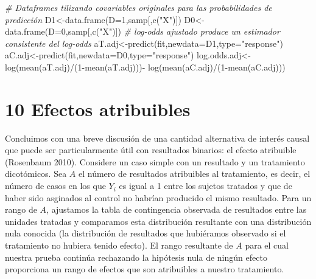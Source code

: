 \documentclass[
]{article}
\newenvironment{Shaded}{\begin{snugshade}}{\end{snugshade}}
\newcommand{\AttributeTok}[1]{\textcolor[rgb]{0.77,0.63,0.00}{#1}}
\newcommand{\CommentTok}[1]{\textcolor[rgb]{0.56,0.35,0.01}{\textit{#1}}}
\newcommand{\DecValTok}[1]{\textcolor[rgb]{0.00,0.00,0.81}{#1}}
\newcommand{\FunctionTok}[1]{\textcolor[rgb]{0.00,0.00,0.00}{#1}}
\newcommand{\NormalTok}[1]{#1}
\newcommand{\OtherTok}[1]{\textcolor[rgb]{0.56,0.35,0.01}{#1}}
\newcommand{\SpecialCharTok}[1]{\textcolor[rgb]{0.00,0.00,0.00}{#1}}
\newcommand{\StringTok}[1]{\textcolor[rgb]{0.31,0.60,0.02}{#1}}
\begin{document}
\begin{Shaded}
\begin{Highlighting}[]
\CommentTok{\# Dataframes tilizando covariables originales para las probabilidades de predicción}
\NormalTok{D1}\OtherTok{\textless{}{-}}\FunctionTok{data.frame}\NormalTok{(}\AttributeTok{D=}\DecValTok{1}\NormalTok{,samp[,}\FunctionTok{c}\NormalTok{(}\StringTok{"X"}\NormalTok{)]) }
\NormalTok{D0}\OtherTok{\textless{}{-}}\FunctionTok{data.frame}\NormalTok{(}\AttributeTok{D=}\DecValTok{0}\NormalTok{,samp[,}\FunctionTok{c}\NormalTok{(}\StringTok{"X"}\NormalTok{)]) }
\CommentTok{\# log{-}odds ajustado produce un estimador consistente del log{-}odds }
\NormalTok{aT.adj}\OtherTok{\textless{}{-}}\FunctionTok{predict}\NormalTok{(fit,}\AttributeTok{newdata=}\NormalTok{D1,}\AttributeTok{type=}\StringTok{"response"}\NormalTok{) }
\NormalTok{aC.adj}\OtherTok{\textless{}{-}}\FunctionTok{predict}\NormalTok{(fit,}\AttributeTok{newdata=}\NormalTok{D0,}\AttributeTok{type=}\StringTok{"response"}\NormalTok{) }
\NormalTok{log.odds.adj}\OtherTok{\textless{}{-}}\FunctionTok{log}\NormalTok{(}\FunctionTok{mean}\NormalTok{(aT.adj)}\SpecialCharTok{/}\NormalTok{(}\DecValTok{1}\SpecialCharTok{{-}}\FunctionTok{mean}\NormalTok{(aT.adj)))}\SpecialCharTok{{-}}
  \FunctionTok{log}\NormalTok{(}\FunctionTok{mean}\NormalTok{(aC.adj)}\SpecialCharTok{/}\NormalTok{(}\DecValTok{1}\SpecialCharTok{{-}}\FunctionTok{mean}\NormalTok{(aC.adj)))}
\end{Highlighting}
\end{Shaded}

\hypertarget{efectos-atribuibles}{%
\section{10 Efectos atribuibles}\label{efectos-atribuibles}}

Concluimos con una breve discusión de una cantidad alternativa de
interés causal que puede ser particularmente útil con resultados
binarios: el efecto atribuible (Rosenbaum 2010). Considere un caso
simple con un resultado y un tratamiento dicotómicos. Sea \(A\) el
número de resultados atribuibles al tratamiento, es decir, el número de
casos en los que \(Y_i\) es igual a 1 entre los sujetos tratados y que
de haber sido asginados al control no habrían producido el mismo
resultado. Para un rango de \(A\), ajustamos la tabla de contingencia
observada de resultados entre las unidades tratadas y comparamos esta
distribución resultante con una distribución nula conocida (la
distribución de resultados que hubiéramos observado si el tratamiento no
hubiera tenido efecto). El rango resultante de \(A\) para el cual
nuestra prueba continúa rechazando la hipótesis nula de ningún efecto
proporciona un rango de efectos que son atribuibles a nuestro
tratamiento.
\end{document}
